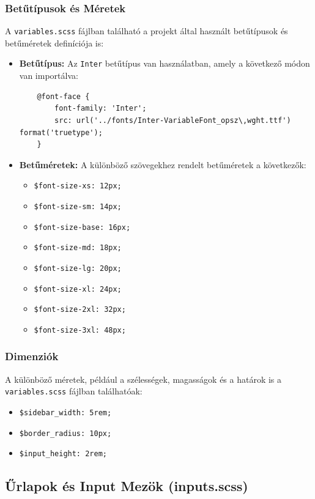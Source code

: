 \documentclass[12pt]{report}
\begin{document}
\subsubsection{Betűtípusok és Méretek}
A \texttt{variables.scss} fájlban található a projekt által használt betűtípusok és betűméretek definíciója is:

\begin{itemize}
    \item \textbf{Betűtípus:} Az \texttt{Inter} betűtípus van használatban, amely a következő módon van importálva:
    \begin{verbatim}
    @font-face {
        font-family: 'Inter';
        src: url('../fonts/Inter-VariableFont_opsz\,wght.ttf') format('truetype');
    }
    \end{verbatim}
    \item \textbf{Betűméretek:} A különböző szövegekhez rendelt betűméretek a következők:
    \begin{itemize}
        \item \texttt{\$font-size-xs: 12px;}
        \item \texttt{\$font-size-sm: 14px;}
        \item \texttt{\$font-size-base: 16px;}
        \item \texttt{\$font-size-md: 18px;}
        \item \texttt{\$font-size-lg: 20px;}
        \item \texttt{\$font-size-xl: 24px;}
        \item \texttt{\$font-size-2xl: 32px;}
        \item \texttt{\$font-size-3xl: 48px;}
    \end{itemize}
\end{itemize}

\subsubsection{Dimenziók}
A különböző méretek, például a szélességek, magasságok és a határok is a \texttt{variables.scss} fájlban találhatóak:

\begin{itemize}
    \item \texttt{\$sidebar\_width: 5rem;}
    \item \texttt{\$border\_radius: 10px;}
    \item \texttt{\$input\_height: 2rem;}
\end{itemize}

\subsection{Űrlapok és Input Mezök (inputs.scss)}
\end{document}

